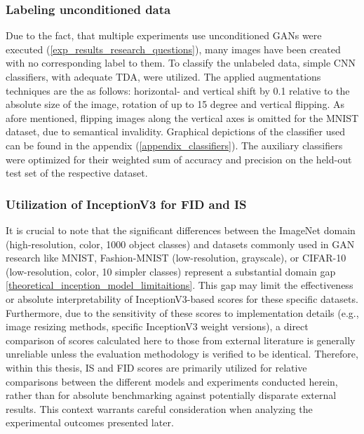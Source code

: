 \subsubsection{Labeling unconditioned data}\label{body_experiment_labeling_data}
Due to the fact, that multiple experiments use unconditioned GANs were executed (\ref{exp_results_research_questions}), many images have been created with no corresponding label to them. To classify the unlabeled data, simple CNN classifiers, with adequate TDA, were utilized. The applied augmentations techniques are the as follows: horizontal- and vertical shift by 0.1 relative to the absolute size of the image, rotation of up to 15 degree and vertical flipping. As afore mentioned, flipping images along the vertical axes is omitted for the MNIST dataset, due to semantical invalidity. Graphical depictions of the classifier used can be found in the appendix (\ref{appendix_classifiers}). The auxiliary classifiers were optimized for their weighted sum of accuracy and precision on the held-out test set of the respective dataset.\\


\subsubsection{Utilization of InceptionV3 for FID and IS}\label{body_experiment_inception_model}
It is crucial to note that the significant differences between the ImageNet domain (high-resolution, color, 1000 object classes) and datasets commonly used in GAN research like MNIST, Fashion-MNIST (low-resolution, grayscale), or CIFAR-10 (low-resolution, color, 10 simpler classes) represent a substantial domain gap \ref{theoretical_inception_model_limitaitions}. This gap may limit the effectiveness or absolute interpretability of InceptionV3-based scores for these specific datasets. Furthermore, due to the sensitivity of these scores to implementation details (e.g., image resizing methods, specific InceptionV3 weight versions), a direct comparison of scores calculated here to those from external literature is generally unreliable unless the evaluation methodology is verified to be identical. Therefore, within this thesis, IS and FID scores are primarily utilized for relative comparisons between the different models and experiments conducted herein, rather than for absolute benchmarking against potentially disparate external results. This context warrants careful consideration when analyzing the experimental outcomes presented later.


